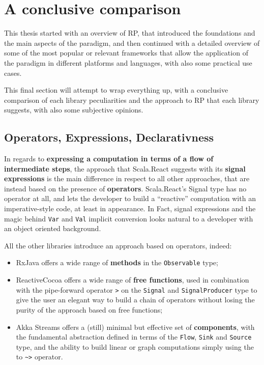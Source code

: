 \chapter{A conclusive comparison}\label{a-conclusive-comparison}

This thesis started with an overview of RP, that introduced the
foundations and the main aspects of the paradigm, and then continued
with a detailed overview of some of the most popular or relevant
frameworks that allow the application of the paradigm in different
platforms and languages, with also some practical use cases.

This final section will attempt to wrap everything up, with a conclusive
comparison of each library peculiarities and the approach to RP that
each library suggests, with also some subjective opinions.

\section{Operators, Expressions,
Declarativness}\label{operators-expressions-declarativness}

In regards to \textbf{expressing a computation in terms of a flow of
intermediate steps}, the approach that Scala.React suggests with its
\textbf{signal expressions} is the main difference in respect to all
other approaches, that are instead based on the presence of
\textbf{operators}. Scala.React's Signal type has no operator at all,
and lets the developer to build a ``reactive'' computation with an
imperative-style code, at least in appearance. In Fact, signal
expressions and the magic behind \texttt{Var} and \texttt{Val} implicit
conversion looks natural to a developer with an object oriented
background.

All the other libraries introduce an approach based on operators,
indeed:

\begin{itemize}
\itemsep1pt\parskip0pt
\item
  RxJava offers a wide range of \textbf{methods} in the
  \texttt{Observable} type;
\item
  ReactiveCocoa offers a wide range of \textbf{free functions}, used in
  combination with the pipe-forward operator
  \texttt{\textbar{}\textgreater{}} on the \texttt{Signal} and
  \texttt{SignalProducer} type to give the user an elegant way to build
  a chain of operators without losing the purity of the approach based
  on free functions;
\item
  Akka Streams offers a (still) minimal but effective set of
  \textbf{components}, with the fundamental abstraction defined in
  terms of the \texttt{Flow}, \texttt{Sink} and \texttt{Source} type,
  and the ability to build linear or graph computations simply using the
  to \texttt{\textasciitilde{}\textgreater{}} operator.
\end{itemize}

